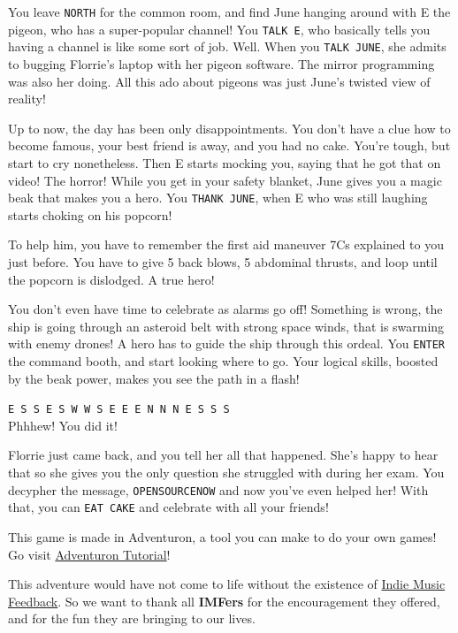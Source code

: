 \documentclass{article}
\newcommand{\bbro}[1] {\textbf{\textcolor{darksienna}{#1}}}
\newcommand{\bckg}[1]{\AddToShipoutPictureBG*{\texttt{[image: \#1]}}}
\begin{document}
\clearpage
{}
\bckg{img/bg}

You leave \texttt{NORTH} for the common room,
and find June hanging around with E the pigeon, who has a super-popular channel!
You \texttt{TALK E}, who basically tells you having a channel is like some sort of job.
Well. When you \texttt{TALK JUNE}, she admits to bugging Florrie's laptop with her pigeon software.
The mirror programming was also her doing.
All this ado about pigeons was just June's twisted view of reality!

Up to now, the day has been only disappointments.
You don't have a clue how to become famous, your best friend is away, and you had no cake.
You're tough, but start to cry nonetheless.
Then E starts mocking you, saying that he got that on video! The horror!
While you get in your safety blanket, June gives you a magic beak that makes you a hero.
You \texttt{THANK JUNE}, when E who was still laughing starts choking on his popcorn!

To help him, you have to remember the first aid maneuver 7Cs explained to you just before.
You have to give 5 back blows, 5 abdominal thrusts, and loop until the popcorn is dislodged.
A true hero!

You don't even have time to celebrate as alarms go off!
Something is wrong, the ship is going through an asteroid belt with strong space winds,
that is swarming with enemy drones! A hero has to guide the ship through this ordeal.
You \texttt{ENTER} the command booth, and start looking where to go.
Your logical skills, boosted by the beak power, makes you see the path in a flash!

\texttt{E S S E S W W S E E E N N N E S S S} \\
Phhhew! You did it!

Florrie just came back, and you tell her all that happened.
She's happy to hear that so she gives you the only question she struggled with during her exam.
You decypher the message, \texttt{OPENSOURCENOW} and now you've even helped her!
With that, you can \texttt{EAT CAKE} and celebrate with all your friends!

\clearpage

\bckg{img/bg}

This game is made in Adventuron, a tool you can make to do your own games!
Go visit \href{https://adventuron.io/documentation/tutorial-a.html}{Adventuron Tutorial}!

This adventure would have not come to life without the existence of \href{https://indiemusicfeedback.com}{Indie Music Feedback}.
So we want to thank all \bbro{IMFers} for the encouragement they offered, and for the fun they are bringing to our lives.
\end{document}
